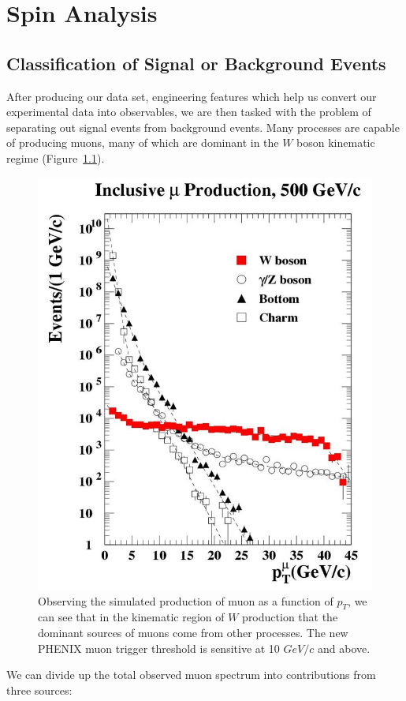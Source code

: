 \chapter{Spin Analysis}
\section{Classification of Signal or Background Events}
After producing our data set, engineering features which help us convert our
experimental data into observables, we are then tasked with the problem of
separating out signal events from background events. Many processes are capable
of producing muons, many of which are dominant in the $W$ boson kinematic
regime (Figure~\ref{fig:muon_production_vs_pt}).

\begin{figure}[H]
	\begin{center}
		\includegraphics[width=0.5\linewidth]{../Chapter5/fig/muon_production_vs_pt.jpg}
		\caption{ Observing the simulated production of muon as a function of $p_T$, we
			can see that in the kinematic region of $W$ production that the dominant sources
			of muons come from other processes. The new PHENIX muon trigger threshold is
			sensitive at 10 $GeV/c$ and above. }
		\label{fig:muon_production_vs_pt}
	\end{center}
\end{figure}

We can divide up the total observed muon spectrum into contributions from three
sources:


